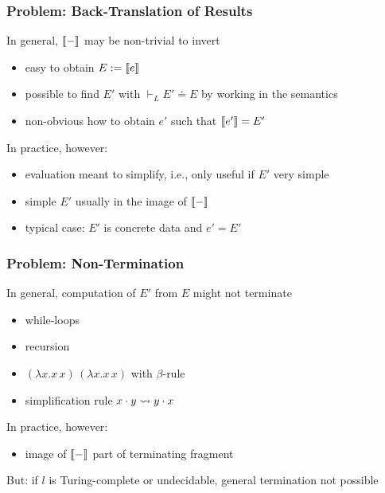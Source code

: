 \begin{frame}\frametitle{Problem: Back-Translation of Results}
In general, $\llbracket -\rrbracket$ may be non-trivial to invert
\begin{itemize}
\item easy to obtain $E:=\llbracket e\rrbracket$
\item possible to find $E'$ with $\vdash_L E'\doteq E$ by working in the semantics
\item non-obvious how to obtain $e'$ such that $\llbracket e'\rrbracket=E'$
\end{itemize}

In practice, however:
\begin{itemize}
\item evaluation meant to simplify, i.e., only useful if $E'$ very simple
\item simple $E'$ usually in the image of $\llbracket -\rrbracket$
\item typical case: $E'$ is concrete data and $e'=E'$ 
\end{itemize}
\end{frame}

\begin{frame}\frametitle{Problem: Non-Termination}
In general, computation of $E'$ from $E$ might not terminate
\begin{itemize}
 \item while-loops
 \item recursion
 \item $(\lambda x. x\,x)\,(\lambda x. x\,x)$ with $\beta$-rule
 \item simplification rule $x\cdot y \rightsquigarrow y\cdot x$ 
\end{itemize}

In practice, however:
\begin{itemize}
\item image of $\llbracket -\rrbracket$ part of terminating fragment
\end{itemize}
But: if $l$ is Turing-complete or undecidable, general termination not possible
\end{frame}


